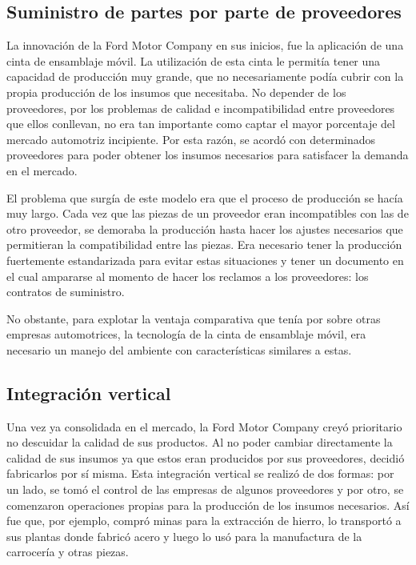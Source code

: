 	\subsection{Suministro de partes por parte de proveedores}
		La innovaci\'on de la Ford Motor Company en sus inicios, fue la aplicaci\'on de una cinta de ensamblaje m\'ovil.
		La utilizaci\'on de esta cinta le permitía tener una capacidad de producci\'on muy grande, que no necesariamente podía cubrir con la propia producci\'on de los insumos que necesitaba.
		No depender de los proveedores, por los problemas de calidad e incompatibilidad entre proveedores que ellos conllevan, no era tan importante como captar el mayor porcentaje del mercado automotriz incipiente.
		Por esta raz\'on, se acord\'o con determinados proveedores para poder obtener los insumos necesarios para satisfacer la demanda en el mercado.

		El problema que surgía de este modelo era que el proceso de producci\'on se hacía muy largo.
		Cada vez que las piezas de un proveedor eran incompatibles con las de otro proveedor, se demoraba la producci\'on hasta hacer los ajustes necesarios que permitieran la compatibilidad entre las piezas.
		Era necesario tener la producci\'on fuertemente estandarizada para evitar estas situaciones y tener un documento en el cual ampararse al momento de hacer los reclamos a los proveedores: los contratos de suministro.

		No obstante, para explotar la ventaja comparativa que tenía por sobre otras empresas automotrices, la tecnología de la cinta de ensamblaje m\'ovil, era necesario un manejo del ambiente con características similares a estas.

	\subsection{Integraci\'on vertical}
		Una vez ya consolidada en el mercado, la Ford Motor Company crey\'o prioritario no descuidar la calidad de sus productos.
		Al no poder cambiar directamente la calidad de sus insumos ya que estos eran producidos por sus proveedores, decidi\'o fabricarlos por sí misma.
		Esta integraci\'on vertical se realiz\'o de dos formas: por un lado, se tom\'o el control de las empresas de algunos proveedores y por otro, se comenzaron operaciones propias para la producci\'on de los insumos necesarios.
		Así fue que, por ejemplo, compr\'o minas para la extracci\'on de hierro, lo transport\'o a sus plantas donde fabric\'o acero y luego lo us\'o para la manufactura de la carrocería y otras piezas.

